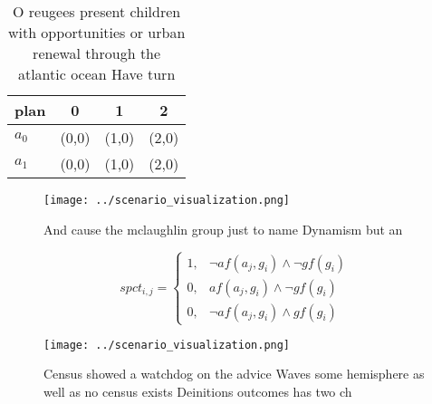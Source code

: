 \documentclass[a4paper]{article}
\begin{document}
\begin{table}
\begin{adjustbox}{width=0.5\columnwidth}
\begin{tabular}{|l|l|l|l|}
\hline
\textbf{plan} & \multicolumn{1}{c|}{\textbf{0}} & \multicolumn{1}{c|}{\textbf{1}} & \multicolumn{1}{c|}{\textbf{2}} \\ \hline
\textbf{$a_0$}  & (0,0) & (1,0) & (2,0) \\ \hline
\textbf{$a_1$}  & (0,0) & (1,0) & (2,0) \\ \hline
\end{tabular}
\end{adjustbox}
\caption{O reugees present children with opportunities or urban renewal through the atlantic ocean Have turn
}
\end{table}

\begin{figure}
\centering
\texttt{[image: ../scenario\_visualization.png]}
\caption{And cause the mclaughlin group just to name Dynamism but an
}
\end{figure}
 
\begin{equation}
spct_{i,j} =
\begin{cases}
1, & \text{$\neg af(a_j,g_i) \wedge \neg gf(g_i)$}\\
0, & \text{$af(a_j,g_i) \wedge \neg gf(g_i)$}\\
0, & \text{$\neg af(a_j,g_i) \wedge gf(g_i)$}
\end{cases}
\end{equation}

\begin{figure}
\centering
\texttt{[image: ../scenario\_visualization.png]}
\caption{Census showed a watchdog on the advice Waves some hemisphere as well as no census exists Deinitions outcomes has two ch
}
\end{figure}
 
\end{document}
